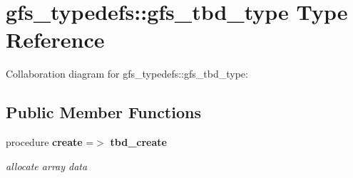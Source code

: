 \section{gfs\+\_\+typedefs\+:\+:gfs\+\_\+tbd\+\_\+type Type Reference}
\label{structgfs__typedefs_1_1gfs__tbd__type}


Collaboration diagram for gfs\+\_\+typedefs\+:\+:gfs\+\_\+tbd\+\_\+type\+:
\subsection*{Public Member Functions}
\begin{DoxyCompactItemize}
\item 
procedure \textbf{ create} =$>$ \textbf{ tbd\+\_\+create}
\begin{DoxyCompactList}\small\item\em allocate array data \end{DoxyCompactList}\end{DoxyCompactItemize}
